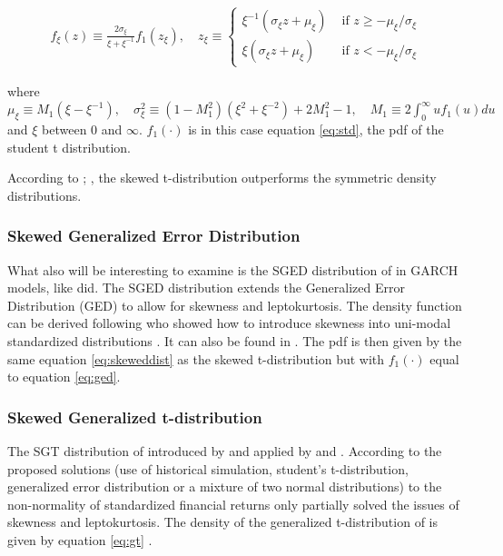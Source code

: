 \documentclass[a4paper, twoside]{templates/ociamthesis}
\begin{document}
\begin{align}
f_{\xi}(z) \equiv \frac{2 \sigma_{\xi}}{\xi+\xi^{-1}} f_{1}\left(z_{\xi}\right), \quad z_{\xi} \equiv\left\{\begin{array}{ll}
\xi^{-1}\left(\sigma_{\xi} z+\mu_{\xi}\right) & \text { if } z \geq-\mu_{\xi} / \sigma_{\xi} \\
\xi\left(\sigma_{\xi} z+\mu_{\xi}\right) & \text { if } z<-\mu_{\xi} / \sigma_{\xi}
\end{array}\right.
 \label{eq:skeweddist}
\end{align}

where \(\mu_{\xi} \equiv M_{1}\left(\xi-\xi^{-1}\right), \quad \sigma_{\xi}^{2} \equiv\left(1-M_{1}^{2}\right)\left(\xi^{2}+\xi^{-2}\right)+2 M_{1}^{2}-1, \quad M_{1} \equiv 2 \int_{0}^{\infty} u f_{1}(u) d u\) and \(\xi\) between \(0\) and \(\infty\). \(f_1(\cdot)\) is in this case equation \eqref{eq:std}, the pdf of the student t distribution.

According to \textcite{giot2003}; \textcite{giot2004}, the skewed t-distribution outperforms the symmetric density distributions.

\hypertarget{skewed-generalized-error-distribution}{%
\subsubsection{Skewed Generalized Error Distribution}\label{skewed-generalized-error-distribution}}

What also will be interesting to examine is the SGED distribution of \textcite{theodossiou2000} in GARCH models, like \textcite{lee2008} did. The SGED distribution extends the Generalized Error Distribution (GED) to allow for skewness and leptokurtosis. The density function can be derived following \textcite{fernández1998} who showed how to introduce skewness into uni-modal standardized distributions \autocite{trottier2015}. It can also be found in \textcite{theodossiou2000}. The pdf is then given by the same equation \eqref{eq:skeweddist} as the skewed t-distribution but with \(f_1(\cdot)\) equal to equation \eqref{eq:ged}.

\hypertarget{skewed-generalized-t-distribution}{%
\subsubsection{Skewed Generalized t-distribution}\label{skewed-generalized-t-distribution}}

The SGT distribution of introduced by \textcite{theodossiou1998} and applied by \textcite{bali2007} and \textcite{bali2008}. According to \textcite{bali2008} the proposed solutions (use of historical simulation, student's t-distribution, generalized error distribution or a mixture of two normal distributions) to the non-normality of standardized financial returns only partially solved the issues of skewness and leptokurtosis. The density of the generalized t-distribution of \textcite{mcdonald1988} is given by equation \eqref{eq:gt} \autocite{bollerslev1994}.
\end{document}
